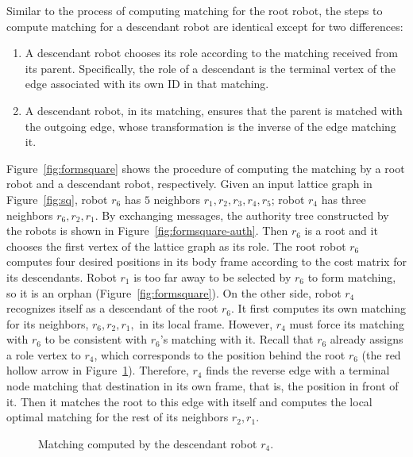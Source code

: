 Similar to the process of computing matching for the root robot, the steps to compute matching for a descendant robot are identical except for two differences:
\begin{enumerate}
\item A descendant robot chooses its role according to the matching received from its parent.  
%
    Specifically, the role of a descendant is the terminal vertex of
  the edge associated with its own ID in that matching. 
\item A descendant robot, in its matching, ensures that the parent is
  matched with the outgoing edge, whose transformation is the inverse of the edge matching it.
\end{enumerate}

Figure~\ref{fig:formsquare} shows the procedure of computing the matching by a root robot and a descendant robot, respectively. 
%
Given an input lattice graph in Figure~\ref{fig:sq}, robot $r_6$ has $5$ neighbors $r_1, r_2, r_3, r_4, r_5$; robot $r_4$ has three neighbors $r_6, r_2, r_1$. 
%
By exchanging messages, the authority tree constructed by the robots is shown in Figure~\ref{fig:formsquare-auth}.
%
Then $r_6$ is a root and it chooses the first vertex of the lattice graph as its role.
%
The root robot $r_6$ computes four desired positions in its body frame according to the cost matrix for its descendants.
%
Robot $r_1$ is too far away to be selected by $r_6$ to form matching, so it is an orphan (Figure~\ref{fig:formsquare}).
%
On the other side, robot $r_4$ recognizes itself as a descendant of the root $r_6$.
%
It first computes its own matching for its neighbors, $r_6, r_2, r_1,$ in its local frame. 
%
However, $r_4$ must force its matching with $r_6$ to be consistent with $r_6$'s matching with it.
%
Recall that $r_6$ already assigns a role vertex to $r_4$, which corresponds to the position behind the root $r_6$ (the red hollow arrow in Figure~\ref{fig:formsquare-des}).
%
Therefore, $r_4$ finds the reverse edge with a terminal node matching that destination in its own frame, that is, the position in front of it. 
%
Then it matches the root to this edge with itself and computes the local optimal matching for the rest of its neighbors $r_2, r_1$.

\begin{figure}
    \centering
    \begin{minipage}{0.9\textwidth}
    \centering
    
    \end{minipage}
    \caption{Matching computed by the descendant robot $r_4$.}
    \label{fig:formsquare-des}
\end{figure}

